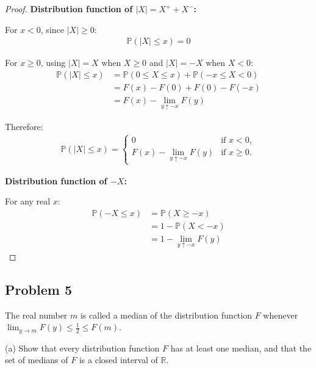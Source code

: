 \documentclass[letterpaper, 11pt]{article}
\newcommand{\1}{\mathds{1}}	%
\theoremstyle{definition}
\begin{document}
\begin{proof}
\textbf{Distribution function of $|X| = X^+ + X^-$:}

For $x < 0$, since $|X| \geq 0$:
\begin{align*}
\mathbb{P}(|X| \leq x) = 0
\end{align*}

For $x \geq 0$, using $|X| = X$ when $X \geq 0$ and $|X| = -X$ when $X < 0$:
\begin{align*}
\mathbb{P}(|X| \leq x) &= \mathbb{P}(0 \leq X \leq x) + \mathbb{P}(-x \leq X < 0)\\
&= F(x) - F(0) + F(0) - F(-x)\\
&= F(x) - \lim_{y \uparrow -x} F(y)
\end{align*}

Therefore:
\begin{align*}
\mathbb{P}(|X| \leq x) = 
\begin{cases}
0 & \text{if } x < 0,\\
F(x) - \lim_{y \uparrow -x} F(y) & \text{if } x \geq 0.
\end{cases}
\end{align*}

\textbf{Distribution function of $-X$:}

For any real $x$:
\begin{align*}
\mathbb{P}(-X \leq x) &= \mathbb{P}(X \geq -x)\\
&= 1 - \mathbb{P}(X < -x)\\
&= 1 - \lim_{y \uparrow -x} F(y)
\end{align*}
    \end{proof}
\subsection*{Problem 5}
The real number $m$ is called a median of the distribution function $F$ whenever $\lim_{y \to m} F(y) \leq \frac{1}{2} \leq F(m)$.

(a) Show that every distribution function $F$ has at least one median, and that the set of medians of $F$ is a closed interval of $\mathbb{R}$.
\end{document}
